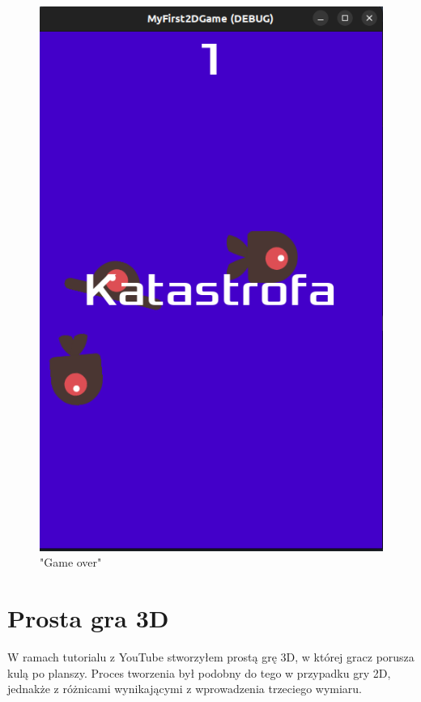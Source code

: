 \documentclass[a4paper]{article}
\begin{document}
\begin{sloppypar}
\begin{center}
\begin{figure}
			\includegraphics[height=0.35\textheight]{game_over.png}
			\caption{"Game over"}
		\end{figure}
	\end{center}
	\clearpage
	\section[htb]{Prosta gra 3D}
	W ramach tutorialu z YouTube stworzyłem prostą grę 3D, w której gracz porusza kulą po planszy. Proces tworzenia był podobny
	do tego w przypadku gry 2D, jednakże z różnicami wynikającymi z wprowadzenia trzeciego wymiaru.
\end{sloppypar}
\end{document}
